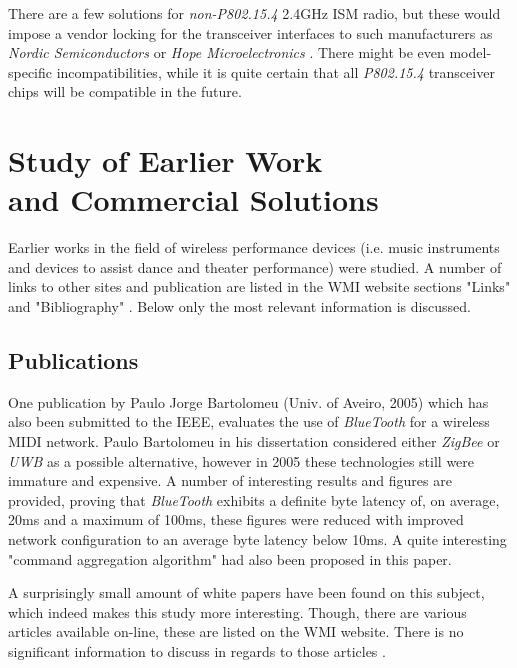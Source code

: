   There are a few solutions for \emph{non-P802.15.4} 2.4GHz ISM radio,
 but these would impose a vendor locking for the transceiver interfaces
 to such manufacturers as \emph{Nordic Semiconductors} \cite{links:nordic:rf2400}
 or \emph{Hope Microelectronics} \cite{links:hoperf:rf2400}.
 There might be even model-specific incompatibilities, while 
 it is quite certain that all \emph{P802.15.4} transceiver
 chips will be compatible in the future.

\break

\section{Study of Earlier Work \\and Commercial Solutions}

  Earlier works in the field of wireless performance devices (i.e. music instruments and
  devices to assist dance and theater performance) were studied. A number of links to
  other sites and publication are listed in the WMI website sections "Links" \cite{wmi:wiki:links}
  and "Bibliography" \cite{wmi:wiki:refs}. Below only the most relevant information is discussed.

\subsection{Publications}

  One publication by Paulo Jorge Bartolomeu (Univ. of Aveiro, 2005)
 \cite{pub:bartolomeu2005} which has also been submitted to the IEEE,
 evaluates the use of \emph{BlueTooth} for a wireless MIDI network.
 Paulo Bartolomeu in his dissertation considered either \emph{ZigBee} or
 \emph{UWB} as a possible alternative, however in 2005 these technologies
 still were immature and expensive. A number of interesting results and
 figures are provided, proving that \emph{BlueTooth} exhibits a definite
 byte latency of, on average, 20ms and a maximum of 100ms, these figures
 were reduced with improved network configuration to an average byte latency
 below 10ms. A quite interesting "command aggregation algorithm" had also
 been proposed in this paper.

 A surprisingly small amount of white papers have been found on this subject, 
 which indeed makes this study more interesting. Though, there are various
 articles available on-line, these are listed on the WMI website. There is
 no significant information to discuss in regards to those articles
 \cite{links:misc:xbeemidi}.
 
